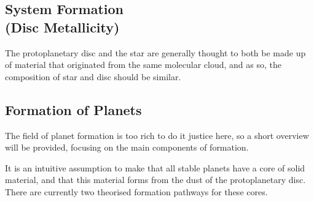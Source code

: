 \documentclass[a4paper,twocolumn,12pt]{article}
\begin{document}
%
%
%

\subsection{System Formation \\(Disc Metallicity)}
\label{subsection: System formation}
The protoplanetary disc and the star are generally thought to both be made up of material that originated from the same molecular cloud, and as so, the composition of star and disc should be similar.%



\subsection{Formation of Planets}
\label{section: Planet formation}
The field of planet formation is too rich to do it justice here, so a short overview will be provided, focusing on the main components of formation.

It is an intuitive assumption to make that all stable planets have a core of solid material, and that this material forms from the dust of the protoplanetary disc. There are currently two theorised formation pathways for these cores.
\end{document}
